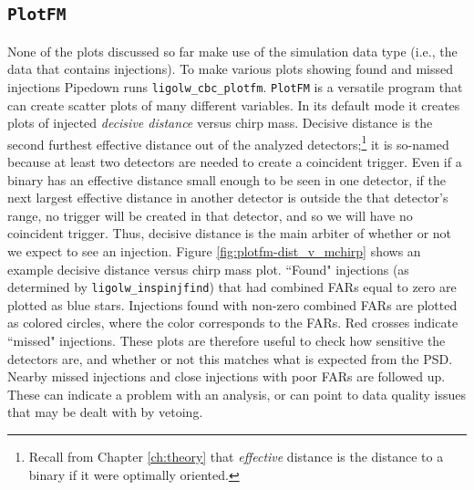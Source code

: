 \subsection{\texttt{PlotFM}}
\label{sec:plotfm}

None of the plots discussed so far make use of the simulation data type (i.e.,
the data that contains injections). To make various plots showing found and
missed injections Pipedown runs \verb|ligolw_cbc_plotfm|. \texttt{PlotFM} is a
versatile program that can create scatter plots of many different variables. In
its default mode it creates plots of injected \emph{decisive distance} versus
chirp mass. Decisive distance is the second furthest effective distance out of
the analyzed detectors;\footnote{Recall from Chapter \ref{ch:theory} that
\emph{effective} distance is the distance to a binary if it were optimally
oriented.} it is so-named because at least two detectors are needed to create a
coincident trigger. Even if a binary has an effective distance small enough to
be seen in one detector, if the next largest effective distance in another
detector is outside the that detector's range, no trigger will be created in
that detector, and so we will have no coincident trigger. Thus, decisive
distance is the main arbiter of whether or not we expect to see an injection.
Figure \ref{fig:plotfm-dist_v_mchirp} shows an example decisive distance versus
chirp mass plot. ``Found" injections (as determined by
\verb|ligolw_inspinjfind|) that had combined \acp{FAR} equal to zero are
plotted as blue stars. Injections found with non-zero combined \acp{FAR} are
plotted as colored circles, where the color corresponds to the \acp{FAR}. Red
crosses indicate ``missed" injections. These plots are therefore useful to
check how sensitive the detectors are, and whether or not this matches what is
expected from the \ac{PSD}. Nearby missed injections and close injections with
poor \acp{FAR} are followed up. These can indicate a problem with an analysis,
or can point to data quality issues that may be dealt with by vetoing.

